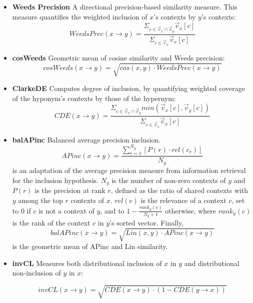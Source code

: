 \documentclass[11pt]{article}
\begin{document}
\begin{itemize}[leftmargin=*]

	\item \textbf{Weeds Precision} \cite{weeds2003general} A directional precision-based similarity measure. This measure quantifies the weighted inclusion of $x$'s contexts by $y$'s contexts: 
	\begin{equation*}
	WeedsPrec(x \rightarrow y)= \frac{\Sigma_{c \in \vec{v}_x \cap \vec{v}_y}{\vec{v}_x[c]}}{\Sigma_{c \in \vec{v}_x}{\vec{v}_x[c]}}
	\end{equation*}
	
	\item \textbf{cosWeeds} \cite{lenci2012identifying} Geometric mean of cosine similarity and Weeds precision:
	\small
	\begin{equation*}
	cosWeeds(x \rightarrow y) = \sqrt{cos(x,y) \cdot WeedsPrec(x \rightarrow y)}
	\end{equation*}
	\normalsize
	
	\item \textbf{ClarkeDE} \cite{clarke2009context} Computes degree of inclusion, by quantifying weighted coverage of the hyponym's contexts by those of the hypernym:
	\small
	\begin{equation*}
	CDE(x \rightarrow y) = \frac{\Sigma_{c \in \vec{v}_x \cap \vec{v}_y}{min(\vec{v}_x[c], \vec{v}_y[c])}}{\Sigma_{c \in \vec{v}_x}{\vec{v}_x[c]}}
	\end{equation*}
	\normalsize

	\item \textbf{balAPinc} \cite{kotlerman2010directional} Balanced average precision inclusion.
	\small
	\begin{equation*}
	APinc(x \rightarrow y) = \frac{\sum_{r=1}^{N_y}{[P(r) \cdot rel(c_r)]}}{N_y}
	\end{equation*}
	\normalsize
	\noindent is an adaptation of the average precision measure from information retrieval for the inclusion hypothesis. $N_y$ is the number of non-zero contexts of $y$ and $P(r)$ is the precision at rank $r$, defined as the ratio of shared contexts with $y$ among the top $r$ contexts of $x$. $rel(c)$ is the relevance of a context $c$, set to 0 if $c$ is not a context of $y$, and to $1-\frac{rank_y(c)}{N_y+1}$ otherwise, where $rank_y(c)$ is the rank of the context $c$ in $y$'s sorted vector. Finally, 
	\small
	\begin{equation*}
	balAPinc(x \rightarrow y) = \sqrt{Lin(x,y) \cdot APinc(x \rightarrow y)}
	\end{equation*}
	\normalsize
	\noindent is the geometric mean of APinc and Lin similarity.

	\item \textbf{invCL} \cite{lenci2012identifying} Measures both distributional inclusion of $x$ in $y$ and distributional
non-inclusion of $y$ in $x$: 

	\small
	\begin{equation*}
	invCL(x \rightarrow y) = \sqrt{CDE(x \rightarrow y) \cdot (1-CDE(y \rightarrow x))}
	\end{equation*}
	\normalsize
	
	\end{itemize}
	
\end{document}
